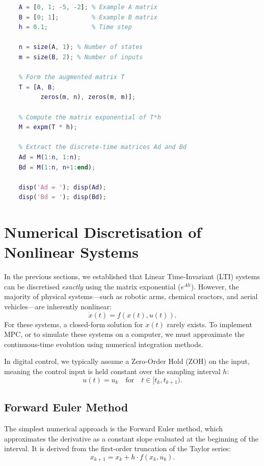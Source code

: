 \begin{lstlisting}[language=Matlab, caption={MATLAB code to perform ZOH discretisation of a forced LTI system.}, label={lst:matlab_zoh}]
	% Define a continuous-time LTI system
	A = [0, 1; -5, -2]; % Example A matrix
	B = [0; 1];         % Example B matrix
	h = 0.1;            % Time step
	
	n = size(A, 1); % Number of states
	m = size(B, 2); % Number of inputs
	
	% Form the augmented matrix T
	T = [A, B; 
		  zeros(m, n), zeros(m, m)];
	
	% Compute the matrix exponential of T*h
	M = expm(T * h);
	
	% Extract the discrete-time matrices Ad and Bd
	Ad = M(1:n, 1:n);
	Bd = M(1:n, n+1:end);
	
	disp('Ad = '); disp(Ad);
	disp('Bd = '); disp(Bd);
\end{lstlisting}

\section{Numerical Discretisation of Nonlinear Systems}

In the previous sections, we established that Linear Time-Invariant (LTI) systems can be discretised \emph{exactly} using the matrix exponential ($e^{Ah}$). However, the majority of physical systems—such as robotic arms, chemical reactors, and aerial vehicles—are inherently nonlinear:
\[
\dot{x}(t) = f(x(t), u(t)).
\]
For these systems, a closed-form solution for $x(t)$ rarely exists. To implement MPC, or to simulate these systems on a computer, we must approximate the continuous-time evolution using numerical integration methods.

In digital control, we typically assume a Zero-Order Hold (ZOH) on the input, meaning the control input is held constant over the sampling interval $h$:
\[
u(t) = u_k \quad \text{for} \quad t \in [t_k, t_{k+1}).
\]

\subsection{Forward Euler Method}
The simplest numerical approach is the Forward Euler method, which approximates the derivative as a constant slope evaluated at the beginning of the interval. It is derived from the first-order truncation of the Taylor series:
\begin{equation}
	x_{k+1} = x_k + h \cdot f(x_k, u_k).
\end{equation}

